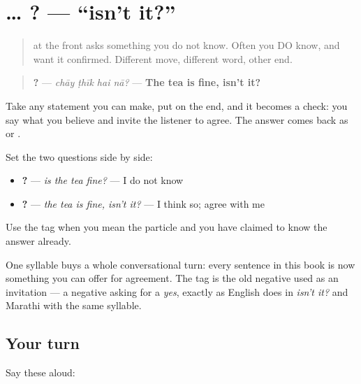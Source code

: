 \section[\texorpdfstring{… \hi{है} \hi{ना}? (… hai nā?)}{… है ना? (… hai nā?)}]{…  ? — \textquotedblleft{}isn't it?\textquotedblright{}}

\label{lesson:HI-C74-na-tag}



\begin{quote}
\textbf{} at the front asks something you do not know. Often you DO know, and want it confirmed. Different move, different word, other end.
\end{quote}

\begin{grammarlens}[title={Grammar Lens: hanging a check on the end}]
\begin{quote}
\textbf{   ?} — \emph{chāy ṭhīk hai nā?} — \textbf{The tea is fine, isn't it?}
\end{quote}

Take any statement you can make, put \textbf{} on the end, and it becomes a check: you say what you believe and invite the listener to agree. The answer comes back as \textbf{} or \textbf{}.

Set the two questions side by side:

\begin{itemize}
\raggedright
  \item \textbf{   ?} — \emph{is the tea fine?} — I do not know
  \item \textbf{   ?} — \emph{the tea is fine, isn't it?} — I think so; agree with me
\end{itemize}

Use the tag when you mean the particle and you have claimed to know the answer already.

One syllable buys a whole conversational turn: every sentence in this book is now something you can offer for agreement. The tag is the old negative \textbf{} used as an invitation — a negative asking for a \emph{yes}, exactly as English does in \emph{isn't it?} and Marathi with the same syllable.
\end{grammarlens}

\subsection*{Your turn}
Say these aloud:

